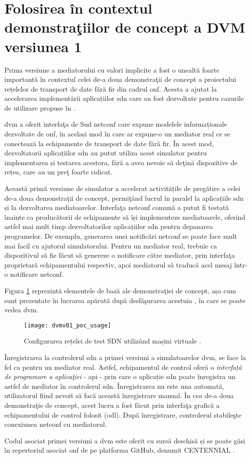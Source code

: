 \section{Folosirea în contextul demonstraţiilor de concept a DVM versiunea 1}

Prima versiune a mediatorului cu valori implicite a fost o unealtă foarte importantă în contextul celei de-a doua demonstraţii de concept a proiectului rețelelor de transport de date fără fir din cadrul \gls{onf}. Acesta a ajutat la accelerarea implementării aplicațiilor \gls{sdn} care au fost dezvoltate pentru cazurile de utilizare propuse în \cite{onf2016_poc2}.

\gls{dvm} a oferit interfaţa de Sud \gls{netconf} care expune modelele informaționale dezvoltate de \gls{onf}, în același mod în care ar expune-o un mediator real ce se conectează la echipamente de transport de date fără fir. În acest mod, dezvoltatorii aplicațiilor \gls{sdn} au putut utiliza acest simulator pentru implementarea și testarea acestora, fără a avea nevoie să deţină dispozitive de rețea, care au un preţ foarte ridicat.

Această primă versiune de simulator a accelerat activitățile de pregătire a celei de-a doua demonstraţii de concept, permiţând lucrul în paralel la aplicațiile \gls{sdn} și la dezvoltarea mediatoarelor. Interfaţa \gls{netconf} comună a putut fi testată înainte ca producătorii de echipamente să își implementeze mediatoarele, oferind astfel mai mult timp dezvoltatorilor aplicațiilor \gls{sdn} pentru depanarea programelor. De exemplu, generarea unei notificări \gls{netconf} se poate face mult mai facil cu ajutorul simulatorului. Pentru un mediator real, trebuie ca dispozitivul să fie făcut să genereze o notificare către mediator, prin interfaţa proprietară echipamentului respectiv, apoi mediatorul să traducă acel mesaj într-o notificare \gls{netconf}.

Figura \ref{fig:dvmv01_poc_usage} reprezintă elementele de bază ale demonstraţiei de concept, așa cum sunt prezentate în lucrarea apărută după desfăşurarea acestuia \cite{onf2016_poc2}, în care se poate vedea \gls{dvm}.

\begin{figure}[h]
	\centering
	\texttt{[image: dvmv01\_poc\_usage]}
	\caption{Configurarea rețelei de test SDN utilizând mașini virtuale \cite{onf2016_poc2}.}
	\label{fig:dvmv01_poc_usage}
\end{figure}

Înregistrarea la controlerul \gls{sdn} a primei versiuni a simulatoarelor \gls{dvm}, se face la fel ca pentru un mediator real. Astfel, echipamentul de control oferă o \textit{interfață de programare a aplicaţiei} - \gls{api} - prin care o aplicație \gls{sdn} poate înregistra un astfel de mediator în controlerul \gls{sdn}. Înregistrarea nu este una automată, utilizatorul fiind nevoit să facă această înregistrare manual. În cea de-a doua demonstraţie de concept, acest lucru a fost făcut prin interfaţa grafică a echipamentului de control folosit (\gls{odl}). După înregistrare, controlerul stabileşte conexiunea \gls{netconf} cu mediatorul.

Codul asociat primei versiuni a \gls{dvm} este oferit cu sursă deschisă și se poate găsi în repertoriul asociat \gls{onf} de pe platforma GitHub, denumit CENTENNIAL \cite{dvmv01github}.